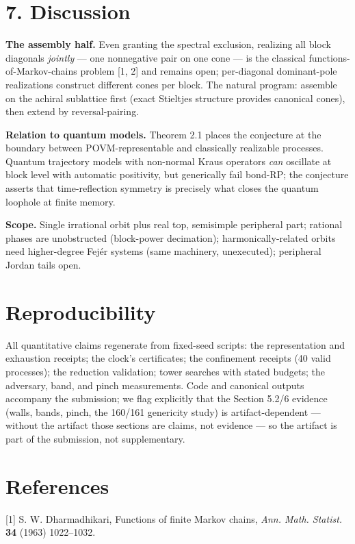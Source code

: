 \documentclass[11pt]{article}
\begin{document}
\section*{7. Discussion}
\textbf{The assembly half.}  Even granting the spectral exclusion, realizing all block diagonals \emph{jointly} — one nonnegative pair on one cone — is the classical functions-of-Markov-chains problem [1, 2] and remains open; per-diagonal dominant-pole realizations construct different cones per block.  The natural program: assemble on the achiral sublattice first (exact Stieltjes structure provides canonical cones), then extend by reversal-pairing.

\textbf{Relation to quantum models.}  Theorem 2.1 places the conjecture at the boundary between POVM-representable and classically realizable processes.  Quantum trajectory models with non-normal Kraus operators \emph{can} oscillate at block level with automatic positivity, but generically fail bond-RP; the conjecture asserts that time-reflection symmetry is precisely what closes the quantum loophole at finite memory.

\textbf{Scope.}  Single irrational orbit plus real top, semisimple peripheral part; rational phases are unobstructed (block-power decimation); harmonically-related orbits need higher-degree Fejér systems (same machinery, unexecuted); peripheral Jordan tails open.

\section*{Reproducibility}
All quantitative claims regenerate from fixed-seed scripts: the representation and exhaustion receipts; the clock's certificates; the confinement receipts (40 valid processes); the reduction validation; tower searches with stated budgets; the adversary, band, and pinch measurements.  Code and canonical outputs accompany the submission; we flag explicitly that the Section 5.2/6 evidence (walls, bands, pinch, the 160/161 genericity study) is artifact-dependent — without the artifact those sections are claims, not evidence — so the artifact is part of the submission, not supplementary.

\section*{References}
[1] S. W. Dharmadhikari, Functions of finite Markov chains, \emph{Ann. Math. Statist.} \textbf{34} (1963) 1022–1032.
\end{document}
